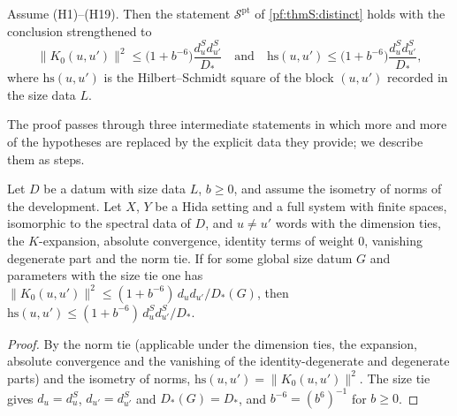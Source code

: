\begin{theorem}\label{pf:thmS:pointwise}
Assume (H1)--(H19). Then the statement $\mathcal{S}^{\mathrm{pt}}$ of
\cref{pf:thmS:distinct} holds with the conclusion strengthened to
\[
\|K_0(u,u')\|^2\le\bigl(1+b^{-6}\bigr)\frac{d^S_ud^S_{u'}}{D_*}\quad\text{and}\quad
\mathrm{hs}(u,u')\le\bigl(1+b^{-6}\bigr)\frac{d^S_ud^S_{u'}}{D_*},
\]
where $\mathrm{hs}(u,u')$ is the Hilbert--Schmidt square of the block $(u,u')$ recorded in the size data $L$.
\end{theorem}

The proof passes through three intermediate statements in which more and more of the hypotheses are replaced by the
explicit data they provide; we describe them as steps.

\begin{lemma}\label{pf:thmS:packagetie}
Let $D$ be a datum with size data $L$, $b\ge0$, and assume the isometry of norms of the development. Let $X$, $Y$ be a
Hida setting and a full system with finite spaces, isomorphic to the spectral data of $D$, and $u\ne u'$ words with
the dimension ties, the $K$-expansion, absolute convergence, identity terms of weight $0$, vanishing degenerate part
and the norm tie. If for some global size datum $G$ and parameters with the size tie one has $\|K_0(u,u')\|^2\le(1+b^{-6})\,d_ud_{u'}/D_*(G)$, then
$\mathrm{hs}(u,u')\le(1+b^{-6})\,d^S_ud^S_{u'}/D_*$.
\end{lemma}

\begin{proof}
By the norm tie (applicable under the dimension ties, the expansion, absolute convergence and the vanishing of the
identity-degenerate and degenerate parts) and the isometry of norms, $\mathrm{hs}(u,u')=\|K_0(u,u')\|^2$. The size tie
gives $d_u=d^S_u$, $d_{u'}=d^S_{u'}$ and $D_*(G)=D_*$, and $b^{-6}=(b^6)^{-1}$ for $b\ge0$.
\end{proof}

